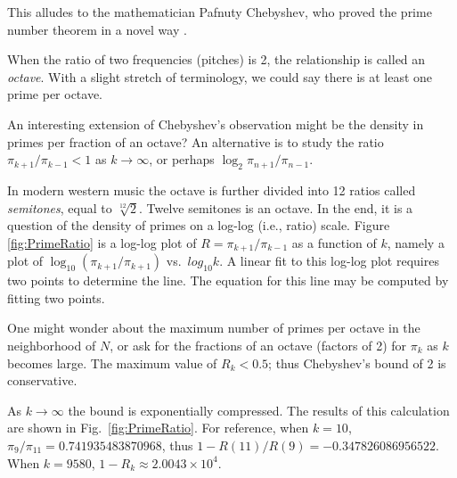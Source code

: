 \documentclass{ximera}
\begin{document}
This alludes to the mathematician Pafnuty Chebyshev, who proved the prime number theorem in a novel way
\citep[p.~585]{JS10}.
  

When the ratio of two frequencies (pitches) is 2, the relationship is called an \emph{octave}.
With a slight stretch of terminology, we could say there is at least one prime per octave.
\Ee

%

\BEx
An interesting extension of Chebyshev's observation might be the density in primes per fraction of an octave?
An alternative is to study the ratio $\pi_{k+1}/\pi_{k-1} <1$ as $k \rightarrow \infty$, or perhaps $\log_2 \pi_{n+1}/\pi_{n-1}$.

\EEx

In modern western music the octave is further divided into 12 ratios called \emph{semitones}, equal to
$\sqrt[12]{2}$. Twelve semitones is an octave.  In the end, it is a question of the density of primes
on a log-log (i.e., ratio) scale.
Figure \ref{fig:PrimeRatio} is a log-log plot of $R={\pi_{k+1}}/{\pi_{k-1}}$
as a function of $k$, namely a 
plot of $\log_{10}(\pi_{k+1}/\pi_{k+1})$ vs.~$log_{10} k$.
A linear fit to this log-log plot requires two points to determine the line.
The equation for this line may be computed by fitting two points.

One might wonder about the maximum number of primes per octave in the neighborhood of $N$, or ask for the
fractions of an octave (factors of 2) for $\pi_k$ as $k$ becomes large.
The maximum value of $R_k<0.5$; thus Chebyshev's bound of 2 is conservative.

As $k\rightarrow \infty$ the bound is exponentially compressed.  The results of this
calculation are shown in Fig.~\ref{fig:PrimeRatio}. 
For reference, when $k=10$, $\pi_{9}/\pi_{11} = 0.741935483870968$,
thus $1-R(11)/R(9) = -0.347826086956522$.
When $k=9580$, $1-R_k \approx 2.0043\!\times\! 10^{4}$.
\end{document}
